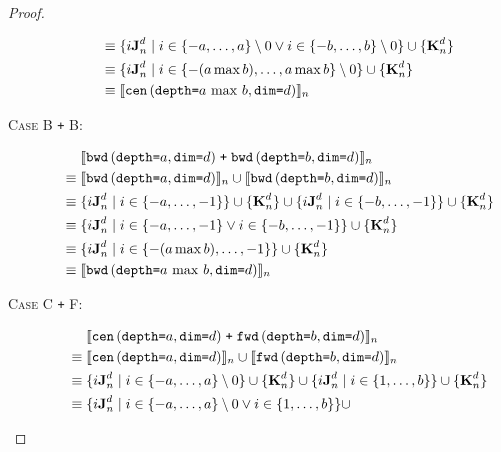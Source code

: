 \begin{proof}
\begin{description}
\begin{align*}
      \equiv & \; \{i\singleEntry{d}{n} \mid i \in \{-a, \ldots, a\} \setminus 0 \vee
                                             i \in \{-b, \ldots, b\} \setminus 0 \} \cup
                  \{\zeroEntry{d}{n}\} \\
      \equiv & \; \{i\singleEntry{d}{n} \mid i \in \{-(a \max b), \ldots, a \max b\} \setminus 0 \} \cup 
                  \{\zeroEntry{d}{n}\}\\
      \equiv & \; \interp{\stenCenS{a \, \max \, b}{d}}_n \\
    \end{align*}
  \item[\textsc{Case B \texttt{+} B}:]
    \begin{align*}
      & \; \interp{\stenBwdS{a}{d} \; \texttt{+} \; \stenBwdS{b}{d}}_{n} \\
      \equiv & \; \interp{\stenBwdS{a}{d}}_{n} \cup \interp{\stenBwdS{b}{d}}_{n} \\
      \equiv & \; \{i\singleEntry{d}{n} \mid i \in \{-a, \ldots, -1\} \} \cup
                  \{\zeroEntry{d}{n}\} \cup
                  \{i\singleEntry{d}{n} \mid i \in \{-b, \ldots, -1\} \} \cup
                  \{\zeroEntry{d}{n}\} \\
      \equiv & \; \{i\singleEntry{d}{n} \mid i \in \{-a, \ldots, -1\} \vee
                                             i \in \{-b, \ldots, -1\} \} \cup
                  \{\zeroEntry{d}{n}\} \\
      \equiv & \; \{i\singleEntry{d}{n} \mid i \in \{-(a \max b), \ldots, -1 \} \} \cup 
                  \{\zeroEntry{d}{n}\}\\
      \equiv & \; \interp{\stenBwdS{a \, \max \, b}{d}}_n \\
    \end{align*}
  \item[\textsc{Case C \texttt{+} F}:]
    \begin{align*}
      & \; \interp{\stenCenS{a}{d} \; \texttt{+} \; \stenFwdS{b}{d}}_{n} \\
      \equiv & \; \interp{\stenCenS{a}{d}}_{n} \cup \interp{\stenFwdS{b}{d}}_{n} \\
      \equiv & \; \{i\singleEntry{d}{n} \mid i \in \{-a, \ldots, a\} \setminus 0 \} \cup
                  \{\zeroEntry{d}{n}\} \cup
                  \{i\singleEntry{d}{n} \mid i \in \{1, \ldots, b\} \} \cup
                  \{\zeroEntry{d}{n}\} \\
      \equiv & \; \{i\singleEntry{d}{n} \mid i \in \{-a, \ldots, a\} \setminus 0
                    \vee i \in \{1, \ldots, b\} \} \cup

\end{align*}
\end{description}
\end{proof}

